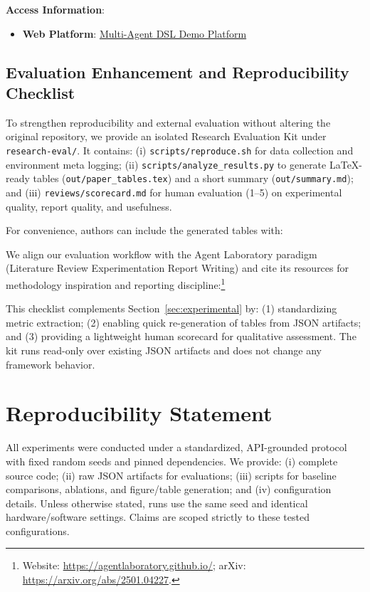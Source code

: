 \documentclass[conference]{IEEEtran}
\begin{document}
\textbf{Access Information}:
\begin{itemize}
\item \textbf{Web Platform}: \href{https://max-yuan-22.github.io/Multi-Agent_DSLframework/dsl-demo}{Multi-Agent DSL Demo Platform}
\end{itemize}

\subsection{Evaluation Enhancement and Reproducibility Checklist}

To strengthen reproducibility and external evaluation without altering the original repository, we provide an isolated Research Evaluation Kit under \texttt{research-eval/}. It contains: (i) \texttt{scripts/reproduce.sh} for data collection and environment meta logging; (ii) \texttt{scripts/analyze\_results.py} to generate LaTeX-ready tables (\texttt{out/paper\_tables.tex}) and a short summary (\texttt{out/summary.md}); and (iii) \texttt{reviews/scorecard.md} for human evaluation (1--5) on experimental quality, report quality, and usefulness.

For convenience, authors can include the generated tables with:
\

We align our evaluation workflow with the Agent Laboratory paradigm (Literature Review \textrightarrow{} Experimentation \textrightarrow{} Report Writing) and cite its resources for methodology inspiration and reporting discipline:\footnote{Website: \url{https://agentlaboratory.github.io/}; arXiv: \url{https://arxiv.org/abs/2501.04227}.}

This checklist complements Section~\ref{sec:experimental} by: (1) standardizing metric extraction; (2) enabling quick re-generation of tables from JSON artifacts; and (3) providing a lightweight human scorecard for qualitative assessment. The kit runs read-only over existing JSON artifacts and does not change any framework behavior.

\section{Reproducibility Statement}

All experiments were conducted under a standardized, API-grounded protocol with fixed random seeds and pinned dependencies. We provide: (i) complete source code; (ii) raw JSON artifacts for evaluations; (iii) scripts for baseline comparisons, ablations, and figure/table generation; and (iv) configuration details. Unless otherwise stated, runs use the same seed and identical hardware/software settings. Claims are scoped strictly to these tested configurations.
\end{document}
